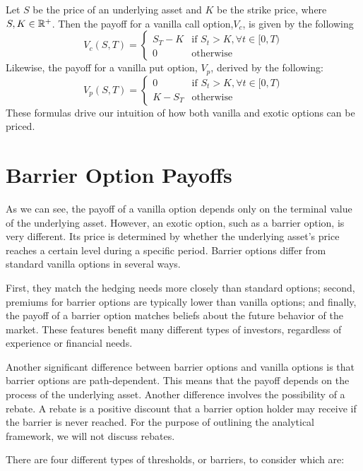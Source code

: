 Let $S$ be the price of an underlying asset and $K$ be the strike price, where $S,K\in\amsbb{R}^+$. Then the payoff for a vanilla call option,$V_c$, is given by the following
\begin{equation}\label{eq:vanilla_call}
	V_c(S,T)=\begin{cases}
		S_T-K  & \text{if }S_t>K,\forall t\in[0,T) \\
		0 & \text{otherwise}
	\end{cases}
\end{equation}
Likewise, the payoff for a vanilla put option, $V_p$, derived by the following:
\begin{equation}
	V_p(S,T)=\begin{cases}\label{eq:vanilla_put}
		0 & \text{if }S_t>K,\forall t\in[0,T) \\
		K-S_T  & \text{otherwise}
	\end{cases}
\end{equation}
These formulas drive our intuition of how both vanilla and exotic options can be priced.
\section{Barrier Option Payoffs}
As we can see, the payoff of a vanilla option depends only on the terminal value of the underlying asset. However, an exotic option, such as a barrier option, is very different. Its price is determined by whether the underlying asset's price reaches a certain level during a specific period. Barrier options differ from standard vanilla options in several ways. 

First, they match the hedging needs more closely than standard options; second, premiums for barrier options are typically lower than vanilla options; and finally, the payoff of a barrier option matches beliefs about the future behavior of the market. These features benefit many different types of investors, regardless of experience or financial needs.

Another significant difference between barrier options and vanilla options is that barrier options are path-dependent. This means that the payoff depends on the process of the underlying asset. Another difference involves the possibility of a rebate. A rebate is a positive discount that a barrier option holder may receive if the barrier is never reached. For the purpose of outlining the analytical framework, we will not discuss rebates.

There are four different types of thresholds, or barriers, to consider which are:


